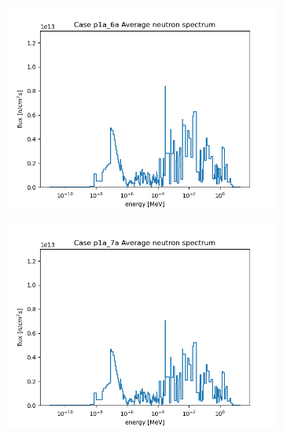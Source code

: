 \documentclass[letterpaper,11pt]{report}
\begin{document}
\begin{figure}[H]
\begin{subfigure}{.33\textwidth}
                \includegraphics[width=\linewidth]{../../phase1a/case6a/analysis_output/p1a_6a_f.png}
                \caption{}
              \end{subfigure}
              \begin{subfigure}{.32\textwidth}
                \centering
                \includegraphics[width=\linewidth]{../../phase1a/case7a/analysis_output/p1a_7a_f.png}
                \caption{}
              \end{subfigure}
            \caption{}
            \label{fig:test}
            \end{figure}
\end{document}
